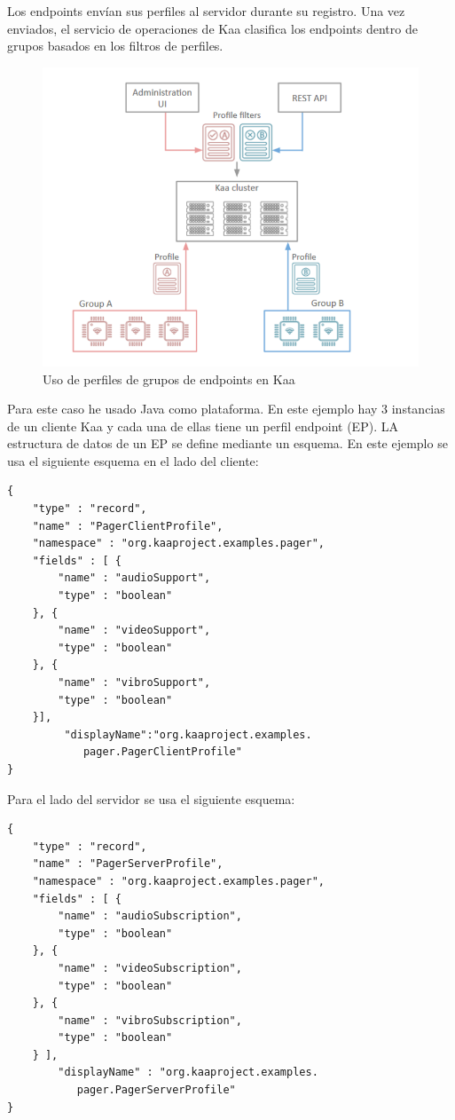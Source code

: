 \documentclass[12pt, twoside]{book}
\begin{document}
Los endpoints envían sus perfiles al servidor durante su registro. Una vez enviados, el servicio de operaciones de Kaa clasifica los endpoints dentro de grupos basados en los filtros de perfiles.
\begin{figure}[H]
\centering
\includegraphics[scale=0.4]{images/filters}
\caption{Uso de perfiles de grupos de endpoints en Kaa}\label{L508}
\end{figure}


Para este caso he usado Java como plataforma. En este ejemplo hay 3 instancias de un cliente Kaa y cada una de ellas tiene un perfil endpoint (EP). LA estructura de datos de un EP se define mediante un esquema. En este ejemplo se usa el siguiente esquema en el lado del cliente:
\begin{lstlisting}
{
 	"type" : "record",
 	"name" : "PagerClientProfile",
	"namespace" : "org.kaaproject.examples.pager",
	"fields" : [ {
		"name" : "audioSupport",
		"type" : "boolean"
  	}, {
		"name" : "videoSupport",
		"type" : "boolean"
	}, {
		"name" : "vibroSupport",
		"type" : "boolean"
	}],
		 "displayName":"org.kaaproject.examples.
		 	pager.PagerClientProfile"
}
\end{lstlisting}
Para el lado del servidor se usa el siguiente esquema:
\begin{lstlisting}
{
	"type" : "record",
	"name" : "PagerServerProfile",
	"namespace" : "org.kaaproject.examples.pager",
	"fields" : [ {
		"name" : "audioSubscription",
		"type" : "boolean"
	}, {
		"name" : "videoSubscription",
		"type" : "boolean"
	}, {
		"name" : "vibroSubscription",
		"type" : "boolean"
	} ],
		"displayName" : "org.kaaproject.examples.
		   pager.PagerServerProfile"
}
\end{lstlisting}
\end{document}
